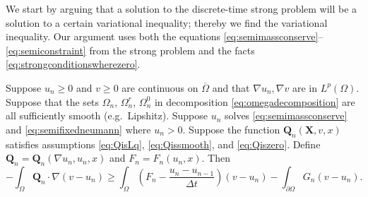\documentclass[final,leqno,onefignum,onetabnum]{siamltex1213bueler}
\newcommand\bQ{\mathbf{Q}}
\newcommand\bX{\mathbf{X}}
\renewcommand{\grad}{\nabla}
\begin{document}
We start by arguing that a solution to the discrete-time strong problem will be a solution to a certain variational inequality; thereby we find the variational inequality.  Our argument uses both the equations  \eqref{eq:semimassconserve}--\eqref{eq:semiconstraint} from the strong problem and the facts \eqref{eq:strongconditionswherezero}.

\medskip
\begin{theorem} Suppose $u_n\ge 0$ and $v\ge 0$ are continuous on $\overline{\Omega}$ and that $\grad u_n,\grad v$ are in $L^p(\Omega)$.  Suppose that the sets $\Omega_n$, $\Omega_n^r$, $\Omega_n^0$ in decomposition \eqref{eq:omegadecomposition} are all sufficiently smooth (e.g.~Lipshitz).  Suppose $u_n$ solves \eqref{eq:semimassconserve} and \eqref{eq:semifixedneumann} where $u_n>0$.  Suppose the function $\bQ_n(\bX,v,x)$ satisfies assumptions \eqref{eq:QisLq}, \eqref{eq:Qissmooth}, and \eqref{eq:Qiszero}.  Define $\bQ_n=\bQ_n(\grad u_n,u_n,x)$ and $F_n = F_n(u_n,x)$.  Then
\begin{equation}
-\int_{\Omega} \bQ_n \cdot \grad(v-u_n) \ge \int_{\Omega} \left(F_n - \frac{u_n - u_{n-1}}{\Delta t}\right) (v-u_n) - \int_{\partial \Omega} G_n (v-u_n). \label{eq:morallytheVI}
\end{equation}
\end{theorem}
\end{document}
